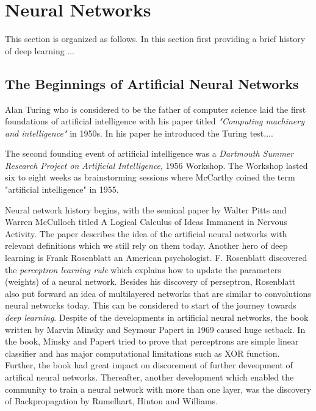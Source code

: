 \setcounter{secnumdepth}{4}
\section{Neural Networks}  \label{cha:foundations_basics_nn}
This section is organized as follows. In this section first providing a brief history of deep learning ...
\subsection{The Beginnings of Artificial Neural Networks}
Alan Turing who is considered to be the father of computer science laid  the first foundations of artificial intelligence with his paper titled \textit{"Computing machinery and intelligence"} in 1950s. In his paper he introduced the Turing test....   

The second founding event of artificial intelligence was a \textit{Dartmouth Summer Research Project on Artificial Intelligence}, 1956 Workshop. The Workshop lasted six to eight weeks as brainstorming sessions where McCarthy coined the term "artificial intelligence" in 1955.


Neural network history begins, with the seminal paper by Walter Pitts and Warren McCulloch titled A Logical Calculus of Ideas Immanent in Nervous Activity. The paper describes the idea of the artificial neural networks with relevant definitions which we still rely on them today. Another hero of deep learning is Frank Rosenblatt an American psychologist. F. Rosenblatt discovered the \textit{perceptron learning rule} which explains how to update the parameters (weights) of a neural network. Besides his discovery of perseptron,  Rosenblatt also put forward an idea of multilayered networks that are similar to convolutions neural networks today. This can be considered to start of the journey towards \textit{deep learning}. Despite of the developments in artificial neural networks,  the book written by Marvin Minsky and Seymour Papert in 1969 caused huge setback. In the book, Minsky and Papert tried to prove that perceptrons are simple linear classifier and has major computational limitations such as XOR function. Further, the book had great impact on discorement of further deveopment of artifical neural networks. Thereafter, another development which enabled the community to train a neural network with more than one layer, was the discovery of Backpropagation by Rumelhart, Hinton and Williams. 

